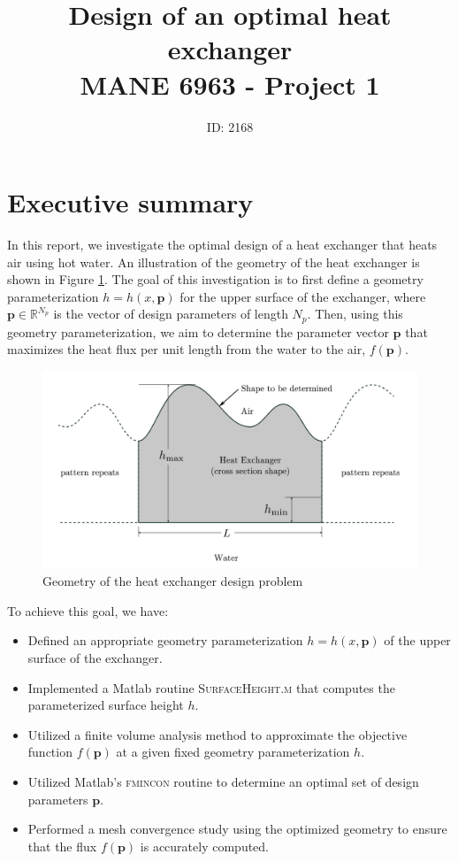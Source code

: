 \documentclass[11pt]{article}
\title{Design of an optimal heat exchanger\\MANE 6963 - Project 1}
\author{ID: 2168}
\date{}
\begin{document}
\maketitle

\section{Executive summary}

In this report, we investigate the optimal design of a heat exchanger that
heats air using hot water. An illustration of the geometry of the heat
exchanger is shown in Figure \ref{fig:exchanger}. The
goal of this investigation is to first define a geometry parameterization
$h = h(x, \boldsymbol{p})$ for the upper surface of the exchanger, where
$\boldsymbol{p} \in \mathbb{R}^{N_p}$ is the vector of design parameters
of length $N_p$. Then, using this geometry parameterization, we aim to
determine the parameter vector $\boldsymbol{p}$ that maximizes the heat
flux per unit length from the water to the air, $f(\boldsymbol{p})$.
\begin{figure}[htb]
\centering
\includegraphics[scale=0.5]{exchanger}
\caption{Geometry of the heat exchanger design problem}
\label{fig:exchanger}
\end{figure}

To achieve this goal, we have:
\begin{itemize}
\item Defined an appropriate geometry parameterization
$h = h(x, \boldsymbol{p})$ of the upper surface of the exchanger.
\item Implemented a Matlab routine \textsc{SurfaceHeight.m} that
computes the parameterized surface height $h$.
\item Utilized a finite volume analysis method to approximate
the objective function $f(\boldsymbol{p})$ at a given fixed
geometry parameterization $h$.
\item Utilized Matlab's \textsc{fmincon} routine to determine an optimal
set of design parameters $\boldsymbol{p}$.
\item Performed a mesh convergence study using the optimized geometry
to ensure that the flux $f(\boldsymbol{p})$ is accurately computed.
\end{itemize}
\end{document}
